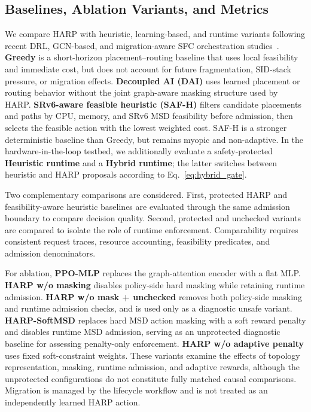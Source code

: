 \documentclass[final,5p]{elsarticle}
\newcommand{\rev}[1]{\textcolor{BrickRed}{#1}}
\begin{document}
\subsection{Baselines, Ablation Variants, and Metrics}
\label{subsec:baselines_metrics}

We compare HARP with heuristic, learning-based, and runtime variants following recent DRL, GCN-based, and migration-aware SFC orchestration studies~\cite{xiao2023twostage,liu2024sfcml,addad2022ai,tariq2023fipam,afrasiabi2024cluster}. \textbf{Greedy} is a short-horizon placement--routing baseline that uses local feasibility and immediate cost, but does not account for future fragmentation, SID-stack pressure, or migration effects. \textbf{Decoupled AI (DAI)} uses learned placement or routing behavior without the joint graph-aware masking structure used by HARP. \textbf{SRv6-aware feasible heuristic (SAF-H)} filters candidate placements and paths by CPU, memory, and SRv6 MSD feasibility before admission, then selects the feasible action with the lowest weighted cost. SAF-H is a stronger deterministic baseline than Greedy, but remains myopic and non-adaptive. In the hardware-in-the-loop testbed, we additionally evaluate a safety-protected \textbf{Heuristic runtime} and a \textbf{Hybrid runtime}; the latter switches between heuristic and HARP proposals according to Eq.~\eqref{eq:hybrid_gate}.

\rev{Two complementary comparisons are considered. First, protected HARP and feasibility-aware heuristic baselines are evaluated through the same admission boundary to compare decision quality. Second, protected and unchecked variants are compared to isolate the role of runtime enforcement. Comparability requires consistent request traces, resource accounting, feasibility predicates, and admission denominators.}

For ablation, \textbf{PPO-MLP} replaces the graph-attention encoder with a flat MLP. \textbf{HARP w/o masking} disables policy-side hard masking while retaining runtime admission. \textbf{HARP w/o mask + unchecked} removes both policy-side masking and runtime admission checks, and is used only as a diagnostic unsafe variant. \textbf{HARP-SoftMSD} replaces hard MSD action masking with a soft reward penalty and disables runtime MSD admission, serving as an unprotected diagnostic baseline for assessing penalty-only enforcement. \textbf{HARP w/o adaptive penalty} uses fixed soft-constraint weights. \rev{These variants examine the effects of topology representation, masking, runtime admission, and adaptive rewards, although the unprotected configurations do not constitute fully matched causal comparisons. Migration is managed by the lifecycle workflow and is not treated as an independently learned HARP action.}
\end{document}
